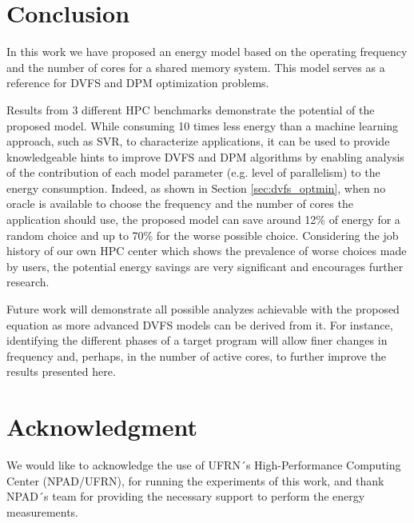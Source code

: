 \documentclass{ieeeaccess}
\begin{document}


\section{Conclusion} \label{sec:conclusion}
In this work we have proposed an energy model based on the operating frequency and the number of cores for a shared memory system. This model serves as a reference for DVFS and DPM optimization problems.

Results from 3 different HPC benchmarks demonstrate the potential of the proposed model. While consuming  10 times less energy than a machine learning approach, such as SVR, to characterize applications, it can be used to provide knowledgeable hints to improve DVFS and DPM algorithms by enabling analysis of the contribution of each model parameter (e.g. level of parallelism) to the energy consumption. Indeed, as shown in Section \ref{sec:dvfs_optmin}, when no oracle is available to choose the frequency and the number of cores the application should use, the proposed model can save around 12\% of energy for a random choice and up to 70\% for the worse possible choice. Considering the job history of our own HPC center which shows the prevalence of worse choices made by users, the potential energy savings are very significant and encourages further research.

Future work will demonstrate all possible analyzes achievable with the proposed equation as more advanced DVFS models can be derived from it. For instance, identifying the different phases of a target program will allow finer changes in frequency and, perhaps, in the number of active cores, to further improve the results presented here.

\section*{Acknowledgment}
We would like to acknowledge the use of UFRN´s High-Performance Computing Center (NPAD/UFRN), for running the experiments of this work, and thank NPAD´s team for providing the necessary support to perform the energy measurements. 
\end{document}
